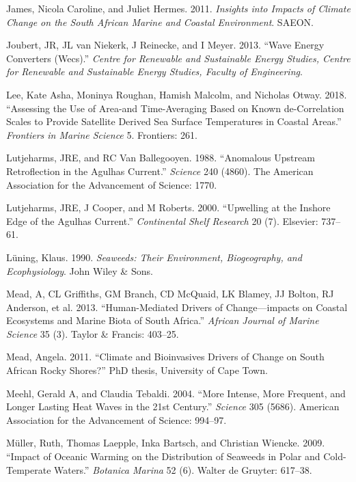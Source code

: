 \documentclass[12pt,A4paper,]{article}
\begin{document}
\hypertarget{ref-James2011}{}
James, Nicola Caroline, and Juliet Hermes. 2011. \emph{Insights into
Impacts of Climate Change on the South African Marine and Coastal
Environment}. SAEON.

\hypertarget{ref-Joubert2013}{}
Joubert, JR, JL van Niekerk, J Reinecke, and I Meyer. 2013. ``Wave
Energy Converters (Wecs).'' \emph{Centre for Renewable and Sustainable
Energy Studies, Centre for Renewable and Sustainable Energy Studies,
Faculty of Engineering}.

\hypertarget{ref-Lee2018}{}
Lee, Kate Asha, Moninya Roughan, Hamish Malcolm, and Nicholas Otway.
2018. ``Assessing the Use of Area-and Time-Averaging Based on Known
de-Correlation Scales to Provide Satellite Derived Sea Surface
Temperatures in Coastal Areas.'' \emph{Frontiers in Marine Science} 5.
Frontiers: 261.

\hypertarget{ref-Lutjeharms1988}{}
Lutjeharms, JRE, and RC Van Ballegooyen. 1988. ``Anomalous Upstream
Retroflection in the Agulhas Current.'' \emph{Science} 240 (4860). The
American Association for the Advancement of Science: 1770.

\hypertarget{ref-Lutjeharms2000}{}
Lutjeharms, JRE, J Cooper, and M Roberts. 2000. ``Upwelling at the
Inshore Edge of the Agulhas Current.'' \emph{Continental Shelf Research}
20 (7). Elsevier: 737--61.

\hypertarget{ref-Luning1990}{}
Lüning, Klaus. 1990. \emph{Seaweeds: Their Environment, Biogeography,
and Ecophysiology}. John Wiley \& Sons.

\hypertarget{ref-Mead2013}{}
Mead, A, CL Griffiths, GM Branch, CD McQuaid, LK Blamey, JJ Bolton, RJ
Anderson, et al. 2013. ``Human-Mediated Drivers of Change---impacts on
Coastal Ecosystems and Marine Biota of South Africa.'' \emph{African
Journal of Marine Science} 35 (3). Taylor \& Francis: 403--25.

\hypertarget{ref-Mead2011}{}
Mead, Angela. 2011. ``Climate and Bioinvasives Drivers of Change on
South African Rocky Shores?'' PhD thesis, University of Cape Town.

\hypertarget{ref-Meehl2004}{}
Meehl, Gerald A, and Claudia Tebaldi. 2004. ``More Intense, More
Frequent, and Longer Lasting Heat Waves in the 21st Century.''
\emph{Science} 305 (5686). American Association for the Advancement of
Science: 994--97.

\hypertarget{ref-Muller2009}{}
Müller, Ruth, Thomas Laepple, Inka Bartsch, and Christian Wiencke. 2009.
``Impact of Oceanic Warming on the Distribution of Seaweeds in Polar and
Cold-Temperate Waters.'' \emph{Botanica Marina} 52 (6). Walter de
Gruyter: 617--38.
\end{document}
